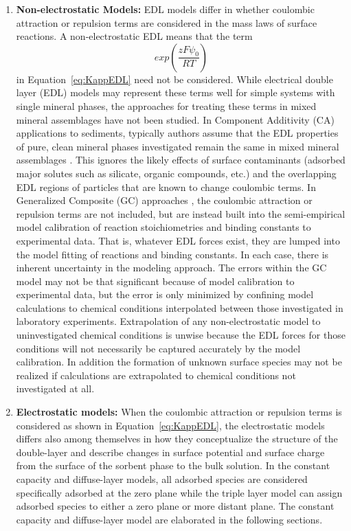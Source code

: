 \begin{enumerate}
\item \textbf{Non-electrostatic Models:}
EDL models differ in whether coulombic attraction or repulsion terms are considered in the mass laws of surface reactions. A non-electrostatic EDL means that the term
\begin{equation}  \label{eq:ElectrostaticExponential}
 exp(\frac{zF\psi_0 }{RT}) 
\end{equation}
 in Equation~\eqref{eq:KappEDL} need not be considered. While electrical double layer (EDL) models may represent these terms well for simple systems with single mineral phases, the approaches for treating these terms in mixed mineral assemblages have not been studied. In Component Additivity (CA) \citep{davis-2004, davis-1998} applications to sediments, typically authors assume that the EDL properties of pure, clean mineral phases investigated remain the same in mixed mineral assemblages \citep{davis-2004}. This ignores the likely effects of surface contaminants (adsorbed major solutes such as silicate, organic compounds, etc.) and the overlapping EDL regions of particles that are known to change coulombic terms. In Generalized Composite (GC) approaches \citep{davis-2004, davis-1998}, the coulombic attraction or repulsion terms are not included, but are instead built into the semi-empirical model calibration of reaction stoichiometries and binding constants to experimental data. That is, whatever EDL forces exist, they are lumped into the model fitting of reactions and binding constants. In each case, there is inherent uncertainty in the modeling approach. The errors within the GC model may not be that significant because of model calibration to experimental data, but the error is only minimized by confining model calculations to chemical conditions interpolated between those investigated in laboratory experiments. Extrapolation of any non-electrostatic model to uninvestigated chemical conditions is unwise because the EDL forces for those conditions will not necessarily be captured accurately by the model calibration. In addition the formation of unknown surface species may not be realized if calculations are extrapolated to chemical conditions not investigated at all.

\item \textbf{Electrostatic models:}
When the coulombic attraction or repulsion terms is considered as shown in Equation~\eqref{eq:KappEDL}, the electrostatic models differs also among themselves in how they conceptualize the structure of the double-layer and describe changes in surface potential and surface charge from the surface of the sorbent phase to the bulk solution. In the constant capacity and diffuse-layer models, all adsorbed species are considered specifically adsorbed at the zero plane while the triple layer model can assign adsorbed species to either a zero plane or more distant plane. The constant capacity and diffuse-layer model are elaborated in the following sections.  


\end{enumerate}
